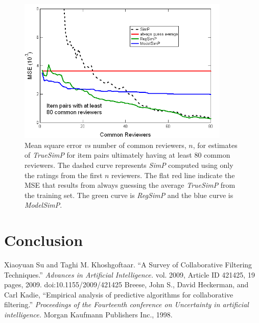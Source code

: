 \documentclass[11pt]{article}
\begin{document}
\begin{figure}[!htbp]
    \centering
    \includegraphics[width=0.9\textwidth]{MSE_SimP_80.png}
	\caption{Mean square error {\em vs} number of common reviewers, $n$, for
estimates of {\em TrueSimP} for item pairs ultimately having at least 80 common
reviewers. The dashed curve represents
{\em SimP} computed using only the ratings from the first $n$ reviewers. The
flat red line indicate the MSE that results from always guessing the average
{\em TrueSimP} from the training set. The green curve is {\em RegSimP} and the
blue curve is {\em ModelSimP}. }
    \label{fig:MSE_SimP}
\end{figure}

\section*{Conclusion}
\begin{thebibliography}{9}

    Xiaoyuan Su and Taghi M. Khoshgoftaar.
    ``A Survey of Collaborative Filtering Techniques.''
    \emph{Advances in Artificial Intelligence.} vol. 2009,
    Article ID 421425, 19 pages, 2009. doi:10.1155/2009/421425
    Breese, John S., David Heckerman, and Carl Kadie, 
    ``Empirical analysis of predictive algorithms for collaborative filtering.'' 
    \emph{Proceedings of the Fourteenth conference on Uncertainty in artificial intelligence.}
    Morgan Kaufmann Publishers Inc., 1998.

\end{thebibliography}
\end{document}
